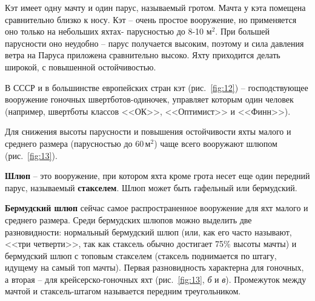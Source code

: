 \documentclass[a4paper, 12pt, twoside, final]{scrbook}
\begin{document}
Кэт имеет одну мачту и один парус, называемый гротом. Мачта у кэта
помещена сравнительно близко к носу. Кэт \--- очень простое вооружение,
но применяется оно только на небольших яхтах- парусностью до 8-10
м$^{2}$. При большей парусности оно неудобно \--- парус получается высоким,
поэтому и сила давления ветра на Паруса приложена сравнительно высоко.
Яхту приходится делать широкой, с повышенной остойчивостью.

В СССР и в большинстве европейских стран кэт (рис.~\ref{fig:12}) \--- господствующее вооружение гоночных швертботов-одиночек, управляет
которым один человек (например, швертботы классов <<ОК>>, <<Оптимист>>
и <<Финн>>).

Для снижения высоты парусности и повышения остойчивости яхты малого
и среднего размера (парусностью до 60\,$\mbox{м}^2$) чаще всего вооружают
шлюпом (рис.~\ref{fig:13}).

\textbf{Шлюп} \--- это вооружение, при котором яхта кроме грота несет
еще один передний парус, называемый \textbf{стакселем}. Шлюп может
быть гафельный или бермудский.

\textbf{Бермудский шлюп} сейчас самое распространенное вооружение для яхт малого
и среднего размера. Среди бермудских шлюпов можно выделить две разновидности:
нормальный бермудский шлюп (или, как его часто называют, <<три четверти>>,
так как стаксель обычно достигает 75\% высоты мачты) и бермудский
шлюп с топовым стакселем (стаксель поднимается по штагу, идущему на
самый топ мачты). Первая разновидность характерна для гоночных, а
вторая \--- для крейсерско-гоночных яхт (рис.~\ref{fig:13},
\emph{б} и \emph{в}). Промежуток между мачтой и стаксель-штагом называется
передним треугольником.
\end{document}
